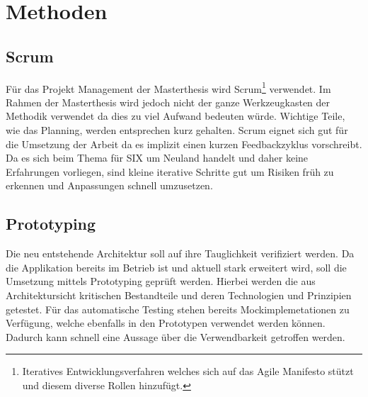 \section{Methoden}

\subsection{Scrum}

Für das Projekt Management der Masterthesis wird Scrum\footnote{Iteratives Entwicklungsverfahren welches sich auf das Agile Manifesto stützt und diesem diverse Rollen hinzufügt.} verwendet. Im Rahmen der Masterthesis wird jedoch nicht der ganze Werkzeugkasten der Methodik verwendet da dies zu viel Aufwand bedeuten würde. Wichtige Teile, wie das Planning, werden entsprechen kurz gehalten.
Scrum eignet sich gut für die Umsetzung der Arbeit da es implizit einen kurzen Feedbackzyklus vorschreibt. Da es sich beim Thema für SIX um Neuland handelt und daher keine Erfahrungen vorliegen, sind kleine iterative Schritte gut um Risiken früh zu erkennen und Anpassungen schnell umzusetzen.

\subsection{Prototyping}
Die neu entstehende Architektur soll auf ihre Tauglichkeit verifiziert werden. Da die Applikation bereits im Betrieb ist und aktuell stark erweitert wird, soll die Umsetzung mittels Prototyping geprüft werden. Hierbei werden die aus Architektursicht kritischen Bestandteile und deren Technologien und Prinzipien getestet. Für das automatische Testing stehen bereits Mockimplemetationen zu Verfügung, welche ebenfalls in den Prototypen verwendet werden können. Dadurch kann schnell eine Aussage über die Verwendbarkeit getroffen werden. 
